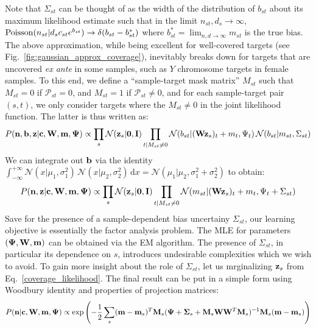 \documentclass[nofootinbib,amssymb,amsmath]{revtex4}
\newcommand{\vzero}{{\bf 0}}
\newcommand{\vI}{{\bf I}}
\newcommand{\vb}{{\bf b}}
\newcommand{\vc}{{\bf c}}
\newcommand{\vz}{{\bf z}}
\newcommand{\vn}{{\bf n}}
\newcommand{\vm}{{\bf m}}
\newcommand{\vM}{{\bf M}}
\newcommand{\vW}{{\bf W}}
\newcommand{\vPsi}{{\bf \Psi}}
\newcommand{\vSigma}{{\bf \Sigma}}
\newcommand{\MM}{M}
\newcommand{\PP}{\mathcal{P}}
\newcommand{\norm}{{\mathcal N}}
\begin{document}
Note that $\Sigma_{st}$ can be thought of as the width of the distribution of $b_{st}$ about its maximum likelihood estimate such that in the limit $n_{st}, d_s \rightarrow \infty$, ${\rm Poisson}(n_{st} | d_s c_{st} e^{b_{st}}) \rightarrow \delta(b_{st} - b^*_{st})$ where $b^*_{st} = \lim_{n,d \rightarrow \infty} m_{st}$ is the true bias. The above approximation, while being excellent for well-covered targets (see Fig.~\ref{fig:gaussian_approx_coverage}), inevitably breaks down for targets that are uncovered {\em ex ante} in some samples, such as $Y$ chromosome targets in female samples. To this end, we define a ``sample-target mask matrix'' $\MM_{st}$ such that $\MM_{st} = 0$ if $\PP_{st} = 0$, and $\MM_{st} = 1$ if $\PP_{st} \neq 0$, and for each sample-target pair $(s,t)$, we only consider targets where the $\MM_{st} \neq 0$ in the joint likelihood function. The latter is thus written as:
\begin{equation}
P(\vn, \vb, \vz | \vc, \vW, \vm, \vPsi) \propto \prod_s \norm(\vz_s | \vzero, \vI) \prod_{t | \MM_{st} \neq 0} \norm(b_{st} | (\vW \vz_s)_t + m_t, \Psi_t) \, \norm(b_{st} | m_{st}, \Sigma_{st})
\end{equation}
We can integrate out $\vb$ via the identity $\int_{-\infty}^{+\infty} \norm(x | \mu_1, \sigma_1^2) \, \norm(x | \mu_2, \sigma_2^2) \, \mathrm{d}x = \norm(\mu_1 | \mu_2, \sigma_1^2 + \sigma_2^2)$ to obtain:
%
\begin{equation}
P(\vn, \vz | \vc, \vW, \vm, \vPsi) \propto \prod_s \norm(\vz_s | \vzero, \vI) \prod_{t | \MM_{st} \neq 0} \norm(m_{st} | (\vW \vz_s)_t + m_t, \Psi_t + \Sigma_{st})
\label{coverage_likelihood}
\end{equation}
Save for the presence of a sample-dependent bias uncertainy $\Sigma_{st}$, our learning objective is essentially the factor analysis problem. The MLE for parameters $(\vPsi, \vW, \vm)$ can be obtained via the EM algorithm. The presence of $\Sigma_{st}$, in particular its dependence on $s$, introduces undesirable complexities which we wish to avoid. To gain more insight about the role of $\Sigma_{st}$, let us mrginalizing $\vz_s$ from Eq.~\eqref{coverage_likelihood}. The final result can be put in a simple form using Woodbury identity and properties of projection matrices:
%
\begin{equation}
P(\vn | \vc, \vW, \vm, \vPsi) \propto \exp \left( -\frac{1}{2} \sum_s (\vm - \vm_s)^T \vM_s (\vPsi + \vSigma_s + \vM_s \vW \vW^T \vM_s)^{-1} \vM_s (\vm - \vm_s) \right)
\label{marginalized coverage_likelihood}
\end{equation}
\end{document}
